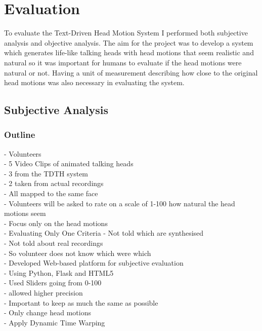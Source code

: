 \documentclass[bsc,frontabs,twoside,singlespacing,parskip]{infthesis}
\begin{document}
\chapter{Evaluation}

To evaluate the Text-Driven Head Motion System I performed both subjective analysis and objective analysis. The aim for the project was to develop a system which generates life-like talking heads with head motions that seem realistic and natural so it was important for humans to evaluate if the head motions were natural or not. Having a unit of measurement describing how close to the original head motions was also necessary in evaluating the system.

\section{Subjective Analysis}

\subsection{Outline}
- Volunteers\\
- 5 Video Clips of animated talking heads \\
- 3 from the TDTH system\\
- 2 taken from actual recordings \\
- All mapped to the same face \\
- Volunteers will be asked to rate on a scale of 1-100 how natural the head motions seem \\
- Focus only on the head motions \\
- Evaluating Only One Criteria
- Not told which are synthesised\\
- Not told about real recordings \\
- So volunteer does not know which were which\\

- Developed Web-based platform for subjective evaluation\\
- Using Python, Flask and HTML5\\
- Used Sliders going from 0-100 \\
- allowed higher precision \\


- Important to keep as much the same as possible\\
- Only change head motions\\
- Apply Dynamic Time Warping\\ 
\end{document}
